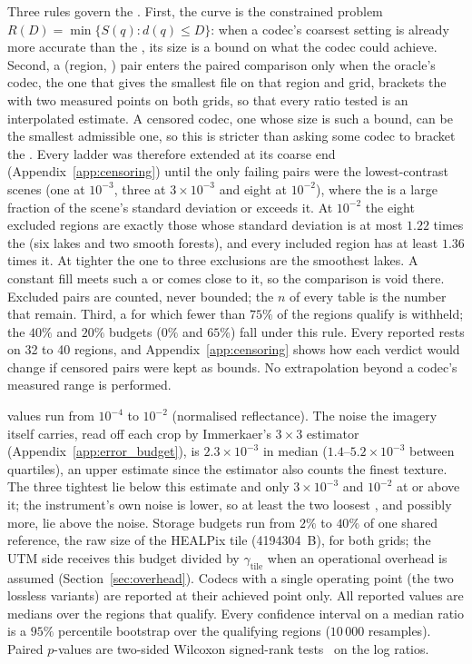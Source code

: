Three rules govern the . First, the curve is the constrained
problem $R(D)=\min\{S(q): d(q)\le D\}$: when a codec's coarsest setting is
already more accurate than the , its size is a bound on what the
codec could achieve. Second, a (region, ) pair enters the paired
comparison only when the oracle's codec, the one that gives the smallest file
on that region and grid, brackets the 
with two measured points on both grids, so that every ratio tested is an
interpolated estimate. A censored codec, one whose size is such a bound, can be the
smallest admissible one, so this is stricter than asking some codec to bracket the .
Every ladder was therefore extended at its coarse end
(Appendix~\ref{app:censoring}) until the only failing pairs were the
lowest-contrast scenes (one at $10^{-3}$, three at $3\times10^{-3}$ and eight at $10^{-2}$),
where the  is a large fraction of the
scene's standard deviation or exceeds it. At $10^{-2}$ the eight
excluded regions are exactly those whose standard deviation is at most
$1.22$ times the  (six lakes and two smooth forests), and every
included region has at least $1.36$ times it. At tighter  the one
to three exclusions are the smoothest lakes. A constant fill meets such a  or comes close to it,
so the comparison is void there. Excluded pairs are counted, never
bounded; the $n$ of every table is the number that remain. Third, a
 for which fewer than $75\%$ of the regions qualify is withheld; the
$40\%$ and $20\%$ budgets ($0\%$ and $65\%$) fall under this rule. Every
reported  rests on 32 to 40 regions, and Appendix~\ref{app:censoring}
shows how each verdict would change if censored pairs were kept as bounds.
No extrapolation beyond a codec's measured range is performed.

 values run from $10^{-4}$ to $10^{-2}$ (normalised
reflectance). The noise the imagery itself carries, read off each crop by
Immerkaer's $3\times3$ estimator~\cite{immerkaer1996fast}
(Appendix~\ref{app:error_budget}), is
$2.3\times10^{-3}$ in median ($1.4$--$5.2\times10^{-3}$ between
quartiles), an upper estimate since the estimator also counts the finest
texture. The three tightest  lie below this estimate and
only $3\times10^{-3}$ and $10^{-2}$ at or above it; the instrument's own
noise is lower, so at least the two loosest , and possibly
more, lie above the noise. Storage budgets run from $2\%$ to $40\%$ of one shared
reference, the raw size of the HEALPix tile (\num{4194304}~B), for both
grids; the UTM side receives this budget divided by $\gamma_{\mathrm{tile}}$
when an operational overhead is assumed (Section~\ref{sec:overhead}).
Codecs with a single operating point (the two lossless variants) are
reported at their achieved point only. All reported values are medians over
the regions that qualify. Every confidence interval on a median ratio is a
$95\%$ percentile bootstrap over the qualifying regions ($10\,000$
resamples). Paired $p$-values are two-sided Wilcoxon signed-rank
tests~\cite{wilcoxon1945} on the log ratios.

